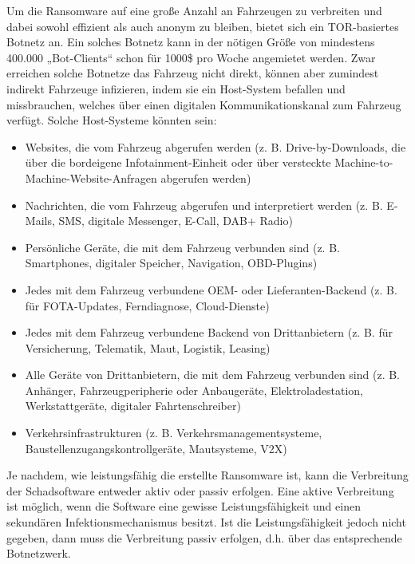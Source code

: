 Um die Ransomware auf eine große Anzahl an Fahrzeugen zu verbreiten 
und dabei sowohl effizient als auch anonym zu bleiben, bietet sich ein TOR-basiertes 
Botnetz an. Ein solches Botnetz kann in der nötigen Größe von mindestens 400.000 
„Bot-Clients“ schon für 1000\$ pro Woche angemietet werden. 
\newline
Zwar erreichen solche Botnetze das Fahrzeug nicht direkt, können aber zumindest 
indirekt Fahrzeuge infizieren, indem sie ein Host-System befallen und missbrauchen, 
welches über einen digitalen Kommunikationskanal zum Fahrzeug verfügt. Solche Host-Systeme 
könnten sein:

\begin{itemize}
    \item Websites, die vom Fahrzeug abgerufen werden (z. B. Drive-by-Downloads, die über 
    die bordeigene Infotainment-Einheit oder über versteckte Machine-to-Machine-Website-Anfragen 
    abgerufen werden)
    \item Nachrichten, die vom Fahrzeug abgerufen und interpretiert werden (z. B. E-Mails, SMS, 
    digitale Messenger, E-Call, DAB+ Radio)
    \item Persönliche Geräte, die mit dem Fahrzeug verbunden sind (z. B. Smartphones, digitaler 
    Speicher, Navigation, OBD-Plugins)
    \item Jedes mit dem Fahrzeug verbundene OEM- oder Lieferanten-Backend (z. B. für FOTA-Updates, 
    Ferndiagnose, Cloud-Dienste)
    \item Jedes mit dem Fahrzeug verbundene Backend von Drittanbietern (z. B. für Versicherung, 
    Telematik, Maut, Logistik, Leasing)
    \item Alle Geräte von Drittanbietern, die mit dem Fahrzeug verbunden sind (z. B. Anhänger, 
    Fahrzeugperipherie oder Anbaugeräte, Elektroladestation, Werkstattgeräte, digitaler 
    Fahrtenschreiber)
    \item Verkehrsinfrastrukturen (z. B. Verkehrsmanagementsysteme, Baustellenzugangskontrollgeräte, 
    \newline Mautsysteme, V2X)
\end{itemize}
	
Je nachdem, wie leistungsfähig die erstellte Ransomware ist, kann die Verbreitung der 
Schadsoftware entweder aktiv oder passiv erfolgen. Eine aktive Verbreitung ist möglich, 
wenn die Software eine gewisse Leistungsfähigkeit und einen sekundären Infektionsmechanismus 
besitzt. Ist die Leistungsfähigkeit jedoch nicht gegeben, dann muss die Verbreitung passiv 
erfolgen, d.h. über das entsprechende Botnetzwerk.   
